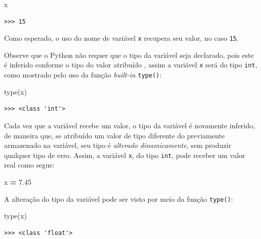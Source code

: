 \documentclass[
]{book}
\newenvironment{Shaded}{\begin{snugshade}}{\end{snugshade}}
\newcommand{\BuiltInTok}[1]{#1}
\newcommand{\FloatTok}[1]{\textcolor[rgb]{0.00,0.00,0.81}{#1}}
\newcommand{\NormalTok}[1]{#1}
\newcommand{\OperatorTok}[1]{\textcolor[rgb]{0.81,0.36,0.00}{\textbf{#1}}}
\begin{document}
\begin{Shaded}
\begin{Highlighting}[]
\NormalTok{x}
\end{Highlighting}
\end{Shaded}

\begin{verbatim}
>>> 15
\end{verbatim}

Como esperado, o uso do nome de variável \texttt{x} recupera seu valor, no caso \texttt{15}.

Observe que o Python não requer que o tipo da variável seja declarado, pois este é inferido conforme o tipo do valor atribuído , assim a variável \texttt{x} será do tipo \texttt{int}, como mostrado pelo uso da função \emph{built-in} \texttt{type()}:

\begin{Shaded}
\begin{Highlighting}[]
\BuiltInTok{type}\NormalTok{(x)}
\end{Highlighting}
\end{Shaded}

\begin{verbatim}
>>> <class 'int'>
\end{verbatim}

Cada vez que a variável recebe um valor, o tipo da variável é novamente inferido, de maneira que, se atribuído um valor de tipo diferente do previamente armazenado na variável, seu tipo é \emph{alterado dinamicamente}, sem produzir qualquer tipo de erro. Assim, a variável \texttt{x}, do tipo \texttt{int}, pode receber um valor real como segue:

\begin{Shaded}
\begin{Highlighting}[]
\NormalTok{x }\OperatorTok{=} \FloatTok{7.45}
\end{Highlighting}
\end{Shaded}

A alteração do tipo da variável pode ser visto por meio da função \texttt{type()}:

\begin{Shaded}
\begin{Highlighting}[]
\BuiltInTok{type}\NormalTok{(x)}
\end{Highlighting}
\end{Shaded}

\begin{verbatim}
>>> <class 'float'>
\end{verbatim}
\end{document}

